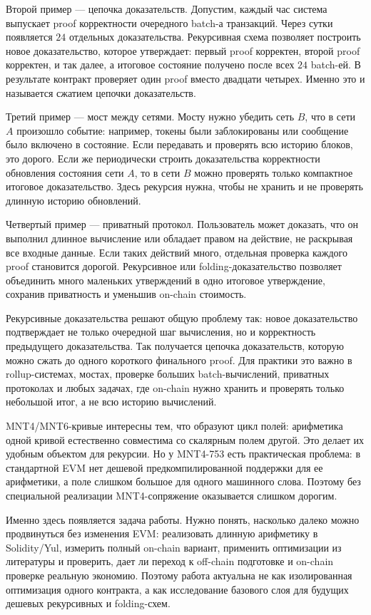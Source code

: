 \documentclass[12pt,a4paper]{article}
\begin{document}
Второй пример --- цепочка доказательств. Допустим, каждый час система выпускает proof корректности очередного batch-а транзакций. Через сутки появляется \(24\) отдельных доказательства. Рекурсивная схема позволяет построить новое доказательство, которое утверждает: первый proof корректен, второй proof корректен, и так далее, а итоговое состояние получено после всех \(24\) batch-ей. В результате контракт проверяет один proof вместо двадцати четырех. Именно это и называется сжатием цепочки доказательств.

Третий пример --- мост между сетями. Мосту нужно убедить сеть \(B\), что в сети \(A\) произошло событие: например, токены были заблокированы или сообщение было включено в состояние. Если передавать и проверять всю историю блоков, это дорого. Если же периодически строить доказательства корректности обновления состояния сети \(A\), то в сети \(B\) можно проверять только компактное итоговое доказательство. Здесь рекурсия нужна, чтобы не хранить и не проверять длинную историю обновлений.

Четвертый пример --- приватный протокол. Пользователь может доказать, что он выполнил длинное вычисление или обладает правом на действие, не раскрывая все входные данные. Если таких действий много, отдельная проверка каждого proof становится дорогой. Рекурсивное или folding-доказательство позволяет объединить много маленьких утверждений в одно итоговое утверждение, сохранив приватность и уменьшив on-chain стоимость.

Рекурсивные доказательства решают общую проблему так: новое доказательство подтверждает не только очередной шаг вычисления, но и корректность предыдущего доказательства. Так получается цепочка доказательств, которую можно сжать до одного короткого финального proof. Для практики это важно в rollup-системах, мостах, проверке больших batch-вычислений, приватных протоколах и любых задачах, где on-chain нужно хранить и проверять только небольшой итог, а не всю историю вычислений.

MNT4/MNT6-кривые интересны тем, что образуют цикл полей: арифметика одной кривой естественно совместима со скалярным полем другой. Это делает их удобным объектом для рекурсии. Но у MNT4-753 есть практическая проблема: в стандартной EVM нет дешевой предкомпилированной поддержки для ее арифметики, а поле слишком большое для одного машинного слова. Поэтому без специальной реализации MNT4-сопряжение оказывается слишком дорогим.

Именно здесь появляется задача работы. Нужно понять, насколько далеко можно продвинуться без изменения EVM: реализовать длинную арифметику в Solidity/Yul, измерить полный on-chain вариант, применить оптимизации из литературы и проверить, дает ли переход к off-chain подготовке и on-chain проверке реальную экономию. Поэтому работа актуальна не как изолированная оптимизация одного контракта, а как исследование базового слоя для будущих дешевых рекурсивных и folding-схем.
\end{document}
